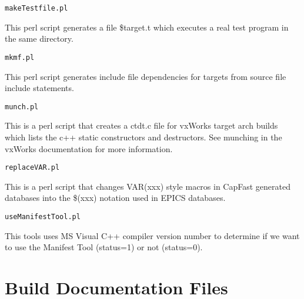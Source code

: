 \begin{description}
\end{description}\begin{verbatim}makeTestfile.pl
\end{verbatim}\begin{description}\item This perl script generates a file \$target.t which executes a real test program in the same directory.

\end{description}\begin{verbatim}mkmf.pl
\end{verbatim}
\begin{description}\item This perl script generates include file dependencies for targets from source file include statements.

\end{description}\begin{verbatim}munch.pl
\end{verbatim}\begin{description}\item This is a perl script that creates a ctdt.c file for vxWorks target arch builds which lists the c++ static constructors 
and destructors. See munching in the vxWorks documentation for more information.

\end{description}\begin{verbatim}replaceVAR.pl
\end{verbatim}
\begin{description}\item This is a perl script that changes VAR(xxx) style macros in CapFast generated databases into the \$(xxx) notation 
used in EPICS databases.

\end{description}\begin{verbatim}useManifestTool.pl
\end{verbatim}\begin{description}\item  This tools uses MS Visual C++ compiler version number to determine if we want to use the Manifest Tool 
(status=1) or not (status=0).

\end{description}\section{Build Documentation Files}

